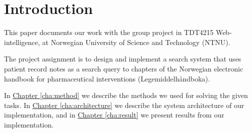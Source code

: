 \chapter{Introduction} \label{cha:Introduction}

This paper documents our work with the group project in TDT4215
Web-intelligence, at Norwegian University of Science and Technology (NTNU).

The project assignment is to design and implement a search system that uses
patient record notes as a search query to chapters of the Norwegian electronic
handbook for pharmaceutical interventions (Legemiddelhåndboka)\cite{nlh}.

In \hyperref[cha:method]{Chapter \ref*{cha:method}} we describe the methods we
used for solving the given tasks.
In \hyperref[cha:architecture]{Chapter \ref*{cha:architecture}} we describe the
system architecture of our implementation, and
in \hyperref[cha:result]{Chapter \ref*{cha:result}} we present results from our
implementation.

